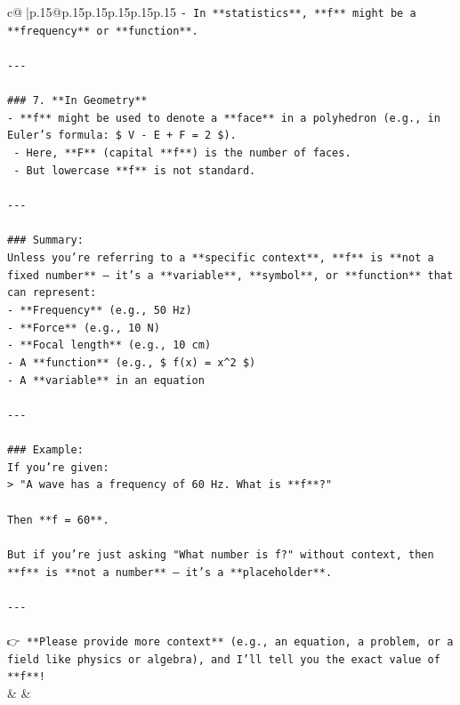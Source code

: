 \documentclass{article}
\begin{document}
{\begin{supertabular}{c@{$\;$}|p{.15\linewidth}@{}p{.15\linewidth}p{.15\linewidth}p{.15\linewidth}p{.15\linewidth}p{.15\linewidth}}
{{{\texttt{{-} In **statistics**, **f** might be a **frequency** or **function**.} \\
\\ 
\texttt{{-}{-}{-}} \\
\\ 
\texttt{\#\#\# 7. **In Geometry**} \\
\texttt{{-} **f** might be used to denote a **face** in a polyhedron (e.g., in Euler's formula: \$ V {-} E + F = 2 \$).} \\
\texttt{  {-} Here, **F** (capital **f**) is the number of faces.} \\
\texttt{  {-} But lowercase **f** is not standard.} \\
\\ 
\texttt{{-}{-}{-}} \\
\\ 
\texttt{\#\#\# Summary:} \\
\texttt{Unless you're referring to a **specific context**, **f** is **not a fixed number** — it's a **variable**, **symbol**, or **function** that can represent:} \\
\texttt{{-} **Frequency** (e.g., 50 Hz)} \\
\texttt{{-} **Force** (e.g., 10 N)} \\
\texttt{{-} **Focal length** (e.g., 10 cm)} \\
\texttt{{-} A **function** (e.g., \$ f(x) = x\^{}2 \$)} \\
\texttt{{-} A **variable** in an equation} \\
\\ 
\texttt{{-}{-}{-}} \\
\\ 
\texttt{\#\#\# Example:} \\
\texttt{If you're given:} \\
\texttt{> "A wave has a frequency of 60 Hz. What is **f**?"} \\
\\ 
\texttt{Then **f = 60**.} \\
\\ 
\texttt{But if you're just asking "What number is f?" without context, then **f** is **not a number** — it's a **placeholder**.} \\
\\ 
\texttt{{-}{-}{-}} \\
\\ 
\texttt{👉 **Please provide more context** (e.g., an equation, a problem, or a field like physics or algebra), and I’ll tell you the exact value of **f**!} \\
            }
        }
    }
    & & \\ \\


\end{supertabular}}
\end{document}

